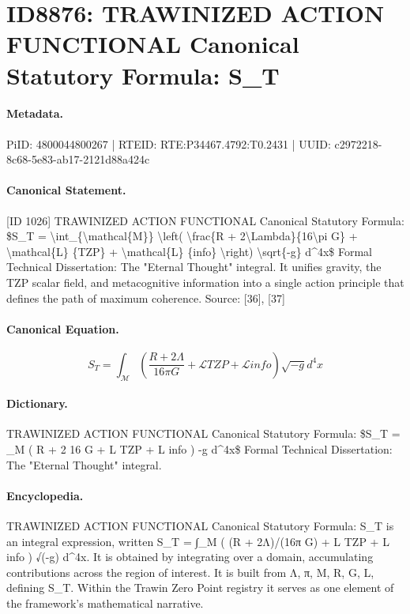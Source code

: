 \section*{ID8876: TRAWINIZED ACTION FUNCTIONAL Canonical Statutory Formula: S\_T}
\paragraph{Metadata.}
PiID: 4800044800267 | RTEID: RTE:P34467.4792:T0.2431 | UUID: c2972218-8c68-5e83-ab17-2121d88a424c

\paragraph{Canonical Statement.}
[ID 1026] TRAWINIZED ACTION FUNCTIONAL Canonical Statutory Formula: \$S\_T = \textbackslash{}int\_\{\textbackslash{}mathcal\{M\}\} \textbackslash{}left( \textbackslash{}frac\{R + 2\textbackslash{}Lambda\}\{16\textbackslash{}pi G\} + \textbackslash{}mathcal\{L\} \{TZP\} + \textbackslash{}mathcal\{L\} \{info\} \textbackslash{}right) \textbackslash{}sqrt\{-g\} d\textasciicircum{}4x\$ Formal Technical Dissertation: The "Eternal Thought" integral. It unifies gravity, the TZP scalar field, and metacognitive information into a single action principle that defines the path of maximum coherence. Source: [36], [37]

\paragraph{Canonical Equation.}
\[
S_T = \int_{\mathcal{M}} \left( \frac{R + 2\Lambda}{16\pi G} + \mathcal{L} {TZP} + \mathcal{L} {info} \right) \sqrt{-g} d^4x
\]

\paragraph{Dictionary.}
TRAWINIZED ACTION FUNCTIONAL Canonical Statutory Formula: \$S\_T = \_M ( R + 2 16 G + L TZP + L info ) -g d\textasciicircum{}4x\$ Formal Technical Dissertation: The "Eternal Thought" integral.

\paragraph{Encyclopedia.}
TRAWINIZED ACTION FUNCTIONAL Canonical Statutory Formula: S\_T is an integral expression, written S\_T = ∫\_M ( (R + 2Λ)/(16π G) + L TZP + L info ) √(-g) d\textasciicircum{}4x. It is obtained by integrating over a domain, accumulating contributions across the region of interest. It is built from Λ, π, M, R, G, L, defining S\_T. Within the Trawin Zero Point registry it serves as one element of the framework's mathematical narrative.
